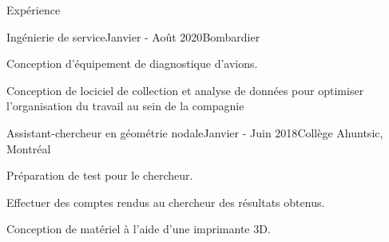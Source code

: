 \documentclass[french,12pt]{resume} %
\begin{document}
	
	
	\begin{rSection}{Expérience}
		
		\begin{rSubsection}{Ingénierie de service}{Janvier - Août 2020}{Bombardier}{}{}
			\item Conception d'équipement de diagnostique d'avions.
			\item Conception de lociciel de collection et analyse de données pour optimiser l'organisation du travail au sein de la compagnie
		\end{rSubsection}
		
		\begin{rSubsection}{Assistant-chercheur en géométrie nodale}{Janvier - Juin 2018}{Collège Ahuntsic, Montréal}{}
			\item   Préparation de test pour le chercheur.
			\item   Effectuer des comptes rendus au chercheur des résultats obtenus.
			\item   Conception de matériel à l’aide d’une imprimante 3D.
		\end{rSubsection}
		
		
	\end{rSection}
	
	
\end{document}
